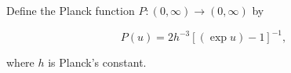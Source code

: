 Define the Planck function $P: (0, \infty) \rightarrow (0, \infty)$ by

$$P(u) = 2h^{-3}[(\exp u) - 1]^{-1},$$

where $h$ is Planck's constant.
